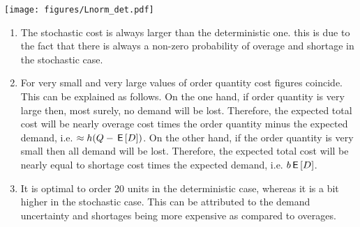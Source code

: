 \begin{exercise}[Continuation]
\begin{solution}
\begin{center}
\texttt{[image: figures/Lnorm\_det.pdf]}
\end{center}

\begin{enumerate}
\item The stochastic cost is always larger than the deterministic one. this is due to the fact that there is always a non-zero probability of overage and shortage in the stochastic case. 
\item For very small and very large values of order quantity cost figures coincide. This can be explained as follows. On the one hand, if order quantity is very large then, most surely, no demand will be lost. Therefore, the expected total cost will be nearly overage cost times the order quantity minus the expected demand, i.e. $\approx h(Q-\,\mathsf{E}\left[D\right])$. On the other hand, if the order quantity is very small then all demand will be lost. Therefore, the expected total cost will be nearly equal to shortage cost times the expected demand, i.e. $b \,\mathsf{E}\left[D\right]$. 
\item It is optimal to order 20 units in the deterministic case, whereas it is a bit higher in the stochastic case. This can be attributed to the demand uncertainty and shortages being more expensive as compared to overages. 
\end{enumerate}

\end{solution}
\end{exercise}




